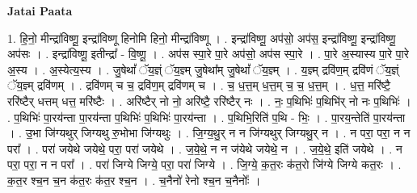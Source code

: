 \documentclass[17pt]{extarticle}
\begin{document}
\textbf{Jatai Paata} \newline

1. हि॒नो॒ मीन्द्रा॑विष्णू॒ इन्द्रा॑विष्णू हिनोमि हिनो॒ मीन्द्रा॑विष्णू । . इन्द्रा॑विष्णू॒ अप॑सो॒ अप॑स॒ इन्द्रा॑विष्णू॒ इन्द्रा॑विष्णू॒ अप॑सः । . इन्द्रा॑विष्णू॒ इतीन्द्रा᳚ - वि॒ष्णू॒ । . अप॑स स्पा॒रे पा॒रे अप॑सो॒ अप॑स स्पा॒रे । . पा॒रे अ॒स्यास्य पा॒रे पा॒रे अ॒स्य । . अ॒स्येत्य॒स्य । . जु॒षेथां᳚ ॅय॒ज्ञ्ं ॅय॒ज्ञ्म् जु॒षेथा᳚म् जु॒षेथां᳚ ॅय॒ज्ञ्म् । . य॒ज्ञ्म् द्रवि॑ण॒म् द्रवि॑णं ॅय॒ज्ञ्ं ॅय॒ज्ञ्म् द्रवि॑णम् । . द्रवि॑णम् च च॒ द्रवि॑ण॒म् द्रवि॑णम् च । . च॒ ध॒त्त॒म् ध॒त्त॒म् च॒ च॒ ध॒त्त॒म् । . ध॒त्त॒ मरि॑ष्टै॒ ररि॑ष्टैर् धत्तम् धत्त॒ मरि॑ष्टैः । . अरि॑ष्टैर् नो नो॒ अरि॑ष्टै॒ ररि॑ष्टैर् नः । . नः॒ प॒थिभिः॑ प॒थिभि॑र् नो नः प॒थिभिः॑ । . प॒थिभिः॑ पा॒रय॑न्ता पा॒रय॑न्ता प॒थिभिः॑ प॒थिभिः॑ पा॒रय॑न्ता । . प॒थिभि॒रिति॑ प॒थि - भिः॒ । . पा॒रय॒न्तेति॑ पा॒रय॑न्ता । . उ॒भा जि॑ग्यथुर् जिग्यथु रु॒भोभा जि॑ग्यथुः । . जि॒ग्य॒थु॒र् न न जि॑ग्यथुर् जिग्यथु॒र् न । . न परा॒ परा॒ न न परा᳚ । . परा॑ जयेथे जयेथे॒ परा॒ परा॑ जयेथे । . ज॒ये॒थे॒ न न ज॑येथे जयेथे॒ न । . ज॒ये॒थे॒ इति॑ जयेथे । . न परा॒ परा॒ न न परा᳚ । . परा॑ जिग्ये जिग्ये॒ परा॒ परा॑ जिग्ये । . जि॒ग्ये॒ क॒त॒रः क॑त॒रो जि॑ग्ये जिग्ये कत॒रः । . क॒त॒र श्च॒न च॒न क॑त॒रः क॑त॒र श्च॒न । . च॒नैनो॑ रेनो श्च॒न च॒नैनोः᳚ । \newline
\end{document}
